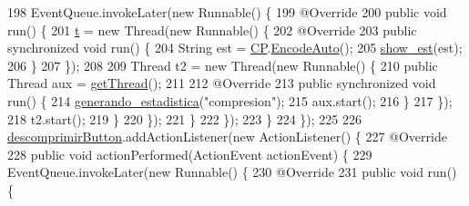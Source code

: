 \begin{DoxyCode}
198                         EventQueue.invokeLater(\textcolor{keyword}{new} Runnable() \{
199                             @Override
200                             \textcolor{keyword}{public} \textcolor{keywordtype}{void} run() \{
201                                 \hyperlink{classpresentacion_1_1form_1_1mainForm_a4643a7a227b8b65874d63d33a5adfc33}{t} = \textcolor{keyword}{new} Thread(\textcolor{keyword}{new} Runnable() \{
202                                     @Override
203                                     \textcolor{keyword}{public} \textcolor{keyword}{synchronized} \textcolor{keywordtype}{void} run() \{
204                                         String est = \hyperlink{classpresentacion_1_1form_1_1mainForm_a4d01396f002d4f9bd18db3877057c77b}{CP}.\hyperlink{classpresentacion_1_1Ctrl__Presentacio_1_1Ctrl__Presentacio_a3c70338349a2890f5191162b22ee78dc}{EncodeAuto}();
205                                         \hyperlink{classpresentacion_1_1form_1_1mainForm_a6eb9e9b4f7bb6da2c592a5a0294a6a06}{show\_est}(est);
206                                     \}
207                                 \});
208 
209                                 Thread t2 = \textcolor{keyword}{new} Thread(\textcolor{keyword}{new} Runnable() \{
210                                     \textcolor{keyword}{public} Thread aux = \hyperlink{classpresentacion_1_1form_1_1mainForm_ac6348f8bdef39bfa651f145c00664320}{getThread}();
211 
212                                     @Override
213                                     \textcolor{keyword}{public} \textcolor{keyword}{synchronized} \textcolor{keywordtype}{void} run() \{
214                                         \hyperlink{classpresentacion_1_1form_1_1mainForm_a34580a4b6e2c162d35ab5502f0ac7e4c}{generando\_estadistica}(\textcolor{stringliteral}{"compresion"});
215                                         aux.start();
216                                     \}
217                                 \});
218                                 t2.start();
219                             \}
220                         \});
221                     \}
222                 \});
223             \}
224         \});
225 
226         \hyperlink{classpresentacion_1_1form_1_1mainForm_a336e6855f8a19241d02376d4ff6a1802}{descomprimirButton}.addActionListener(\textcolor{keyword}{new} ActionListener() \{
227             @Override
228             \textcolor{keyword}{public} \textcolor{keywordtype}{void} actionPerformed(ActionEvent actionEvent) \{
229                 EventQueue.invokeLater(\textcolor{keyword}{new} Runnable() \{
230                     @Override
231                     \textcolor{keyword}{public} \textcolor{keywordtype}{void} run() \{

\end{DoxyCode}

